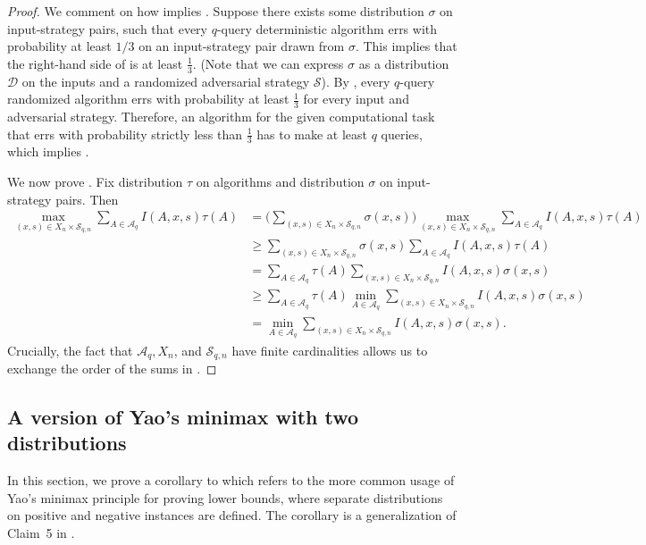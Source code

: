 \documentclass[11pt]{article}
\numberwithin{equation}{section}
\theoremstyle{definition}
\theoremstyle{plain}
\begin{document}
\begin{proof}
		We comment on how  implies . Suppose there exists some distribution $\sigma$ on input-strategy pairs, such that every $q$-query deterministic algorithm errs with probability at least $1/3$ on an input-strategy pair drawn from $\sigma$.
		This implies that the right-hand side of  is at least $\frac{1}{3}$. (Note that we can express $\sigma$ as a distribution $\mathcal{D}$ on the inputs and a randomized adversarial strategy $\mathcal{S}$).  By , every $q$-query randomized algorithm errs with probability at least $\frac{1}{3}$ for every input and adversarial strategy. Therefore, an algorithm for the given computational task that errs with probability strictly less than $\frac{1}{3}$ has to make at least $q$ queries, which implies . 

		
		We now prove . Fix  
  distribution $\tau$ on algorithms and distribution $\sigma$ on input-strategy pairs. Then
		\begin{align}
		\max_{(x, s) \in X_n \times \mathcal{S}_{q,n}} \sum_{A \in \mathcal{A}_q} I(A,x,s)\tau(A) &= \biggl(\sum_{(x, s) \in X_n \times \mathcal{S}_{q,n}}  \sigma(x,s) \biggr) \max_{(x, s) \in X_n \times \mathcal{S}_{q,n}}  \sum_{A \in \mathcal{A}_q} I(A,x,s)\tau(A) \nonumber \\ 
		&\geq \sum_{(x, s) \in X_n \times \mathcal{S}_{q,n}}\sigma(x,s) \sum_{A \in \mathcal{A}_q} I(A,x,s)\tau(A)  \nonumber \\ 
		&= \sum_{A \in \mathcal{A}_q} \tau(A) \sum_{(x, s) \in X_n \times \mathcal{S}_{q,n}} I(A,x,s)\sigma(x,s) \label{eq:exchange} \\ 
		&\geq \sum_{A \in \mathcal{A}_q} \tau(A) \min_{A \in \mathcal{A}_q}\sum_{(x, s) \in X_n \times \mathcal{S}_{q,n}} I(A,x,s)\sigma(x,s)\nonumber  \\ 
		&= \min_{A \in \mathcal{A}_q}\sum_{(x, s) \in X_n \times \mathcal{S}_{q,n}} I(A,x,s)\sigma(x,s). \nonumber
		\end{align}
		Crucially, the fact that $\mathcal{A}_q, X_n$, and  $\mathcal{S}_{q,n}$ have finite cardinalities
		allows us to exchange the order of the sums in .
	\end{proof}
	
%
\subsection{A version of Yao's minimax with two distributions}\label{sec:yao_2}
In this section, we prove a corollary to  which refers to the more common usage of Yao's minimax principle for proving lower bounds, where separate distributions on positive and negative instances are defined. The corollary is a generalization of  Claim~5 in \cite{RS06}. 
\end{document}
